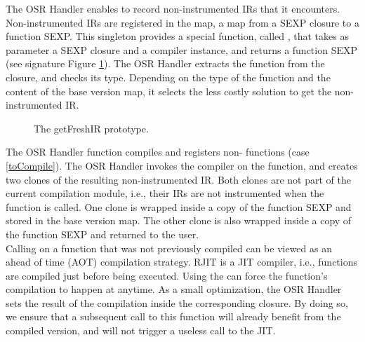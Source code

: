 The OSR Handler enables to record non-instrumented IRs that it encounters.
Non-instrumented IRs are registered in the  map, a map from a SEXP closure to a  function SEXP.
This singleton provides a special function, called , that takes as parameter a SEXP closure and a compiler instance, and returns a function SEXP (see signature Figure \ref{fig:getfreshir}).
The OSR Handler extracts the function from the closure, and checks its type.
Depending on the type of the function and the content of the base version map, it selects the less costly solution to get the non-instrumented IR.\\

\begin{figure}[h]
\caption{The getFreshIR prototype.}
\label{fig:getfreshir}
\end{figure}

The OSR Handler  function compiles and registers non- functions (case \ref{toCompile}).
The OSR Handler invokes the compiler on the function, and creates two clones of the resulting non-instrumented IR.
Both clones are not part of the current compilation module, i.e., their IRs are not instrumented when the  function is called.
One clone is wrapped inside a copy of the function SEXP and stored in the base version map.
The other clone is also wrapped inside a copy of the function SEXP and returned to the user.\\

Calling  on a function that was not previously compiled can be viewed as an ahead of time (AOT) compilation strategy.
RJIT is a JIT compiler, i.e., functions are compiled just before being executed.
Using the  can force the function's compilation to happen at anytime.
As a small optimization, the OSR Handler sets the result of the compilation inside the corresponding closure.
By doing so, we ensure that a subsequent call to this function will already benefit from the compiled version, and will not trigger a useless call to the JIT.\\


